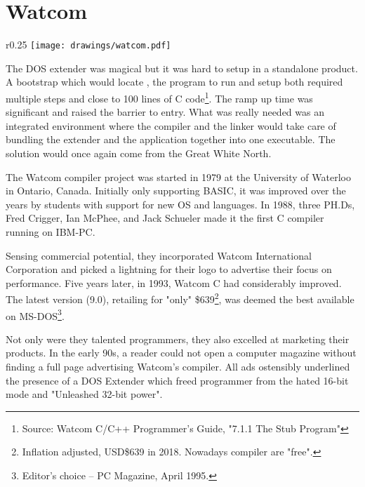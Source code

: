 \section{Watcom}

\begin{wrapfigure}[9]{r}{0.25\textwidth}
\centering
\texttt{[image: drawings/watcom.pdf]}
\end{wrapfigure}


The DOS extender was magical but it was hard to setup in a standalone product. A bootstrap which would locate , the program to run and setup both required multiple steps and close to 100 lines of C code\footnote{Source: Watcom C/C++ Programmer's Guide, "7.1.1 The Stub Program"}. The ramp up time was significant and raised the barrier to entry. What was really needed was an integrated environment where the compiler and the linker would take care of bundling the extender and the application together into one executable. The solution would once again come from the Great White North.\\ 
\par

The Watcom compiler project was started in 1979 at the University of Waterloo in Ontario, Canada. Initially only supporting BASIC, it was improved over the years by students with support for new OS and languages. In 1988, three PH.Ds, Fred Crigger, Ian McPhee, and Jack Schueler made it the first C compiler running on IBM-PC.\\
\par
Sensing commercial potential, they incorporated Watcom International Corporation and picked a lightning for their logo to advertise their focus on performance. Five years later, in 1993, Watcom C had considerably improved. The latest version (9.0), retailing for "only" \$639\footnote{Inflation adjusted, USD\$639 in 2018. Nowadays compiler are "free".},  was deemed the best available on MS-DOS\footnote{Editor's choice -- PC Magazine, April 1995.}. \\
\par
Not only were they talented programmers, they also excelled at marketing their products. In the early 90s, a reader could not open a computer magazine without finding a full page advertising Watcom's compiler. All ads ostensibly underlined the presence of a DOS Extender which freed programmer from the hated 16-bit mode and "Unleashed 32-bit power".
\par
\label{watcomad}




